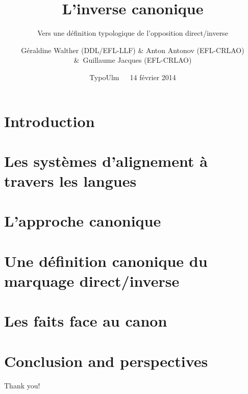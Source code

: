 \documentclass[utf8x]{beamer}
\title[Marquage canonique du direct/inverse]{L'inverse canonique}
\subtitle{Vers une définition typologique de l'opposition direct/inverse}
\author[Walther/Antonov/Jacques]{G\'eraldine Walther (DDL/EFL-LLF) \&
  Anton Antonov (EFL-CRLAO) \&~Guillaume
Jacques (EFL-CRLAO)}
\institute[EFL/CRLAO/LLF/DDL]{Empirical Foundations of
  Linguistics (EFL)\\%
~\\
\url{geraldine.walther@univ-lyon2.fr}\\
\url{a.antonov@gmail.com}\\
\url{rgyalrongskad@gmail.com}
}%
\date[TypoUlm 14/02/2014]{TypoUlm~~~14 février 2014}
\begin{document}
\begin{frame}[noframenumbering]
  \titlepage
\end{frame}


\section*{Introduction}
%


\section[Alignement]{Les systèmes d'alignement à travers les langues}



\section{L'approche canonique}


\section{Une définition canonique du marquage direct/inverse}


\section{Les faits face au canon}


\section[Conclusion]{Conclusion and perspectives}


\begin{frame}[t]{}
\vspace*{3cm}
\begin{center}
\Large Thank you!
\end{center}

\end{frame}

%
%
%  
% 



%

\end{document}
